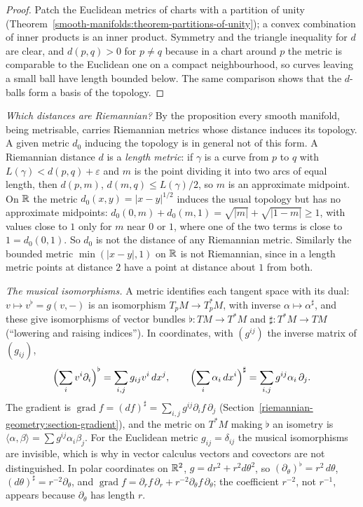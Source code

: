 \begin{proof}
Patch the Euclidean metrics of charts with a partition of unity (Theorem~\ref{smooth-manifolds:theorem-partitions-of-unity}); a convex combination of inner products is an inner product. Symmetry and the
triangle inequality for $d$ are clear, and $d(p, q) > 0$ for $p \neq q$ because in a chart around $p$ the metric is comparable to the Euclidean one on a compact neighbourhood, so curves leaving a small ball
have length bounded below. The same comparison shows that the $d$-balls form a basis of the topology.
\end{proof}

\begin{remark}\label{riemannian-geometry:remark-which-metrics}
\emph{Which distances are Riemannian?} By the proposition every smooth manifold, being metrisable, carries Riemannian metrics whose distance induces its topology. A given metric $d_0$
inducing the topology is in general not of this form. A Riemannian distance $d$ is a \emph{length metric}: if $\gamma$ is a curve from $p$ to $q$ with $L(\gamma) < d(p, q) + \varepsilon$ and $m$ is the point
dividing it into two arcs of equal length, then $d(p, m)$, $d(m, q) \leq L(\gamma)/2$, so $m$ is an approximate midpoint. On $\mathbb{R}$ the metric $d_0(x, y) = |x - y|^{1/2}$ induces the usual topology but has no
approximate midpoints: $d_0(0, m) + d_0(m, 1) = \sqrt{|m|} + \sqrt{|1 - m|} \geq 1$, with values close to $1$ only for $m$ near $0$ or $1$, where one of the two terms is close to $1 = d_0(0, 1)$. So $d_0$ is
not the distance of any Riemannian metric. Similarly the bounded metric $\min(|x - y|, 1)$ on $\mathbb{R}$ is not Riemannian, since in a length metric points at distance $2$ have a point at distance about $1$ from
both.
\end{remark}

\begin{remark}\label{riemannian-geometry:remark-musical}
\emph{The musical isomorphisms.} A metric identifies each tangent space with its dual: $v \mapsto v^\flat = g(v, -)$ is an isomorphism $T_pM \to T_p^*M$, with inverse $\alpha \mapsto \alpha^\sharp$, and these
give isomorphisms of vector bundles $\flat \colon TM \to T^*M$ and $\sharp \colon T^*M \to TM$ (``lowering and raising indices''). In coordinates, with $(g^{ij})$ the inverse matrix of $(g_{ij})$,
\[
\Bigl(\sum_iv^i\partial_i\Bigr)^\flat = \sum_{i,j}g_{ij}v^i\,dx^j, \qquad \Bigl(\sum_i\alpha_i\,dx^i\Bigr)^\sharp = \sum_{i,j}g^{ij}\alpha_i\,\partial_j .
\]
The gradient is $\operatorname{grad}f = (df)^\sharp = \sum_{i,j}g^{ij}\partial_if\,\partial_j$ (Section~\ref{riemannian-geometry:section-gradient}), and the metric on $T^*M$ making $\flat$ an isometry is
$\langle\alpha, \beta\rangle = \sum g^{ij}\alpha_i\beta_j$. For the Euclidean metric $g_{ij} = \delta_{ij}$ the musical isomorphisms are invisible, which is why in vector calculus vectors and covectors are not
distinguished. In polar coordinates on $\mathbb{R}^2$, $g = dr^2 + r^2d\theta^2$, so $(\partial_\theta)^\flat = r^2\,d\theta$, $(d\theta)^\sharp = r^{-2}\partial_\theta$, and
$\operatorname{grad}f = \partial_rf\,\partial_r + r^{-2}\partial_\theta f\,\partial_\theta$; the coefficient $r^{-2}$, not $r^{-1}$, appears because $\partial_\theta$ has length $r$.
\end{remark}

